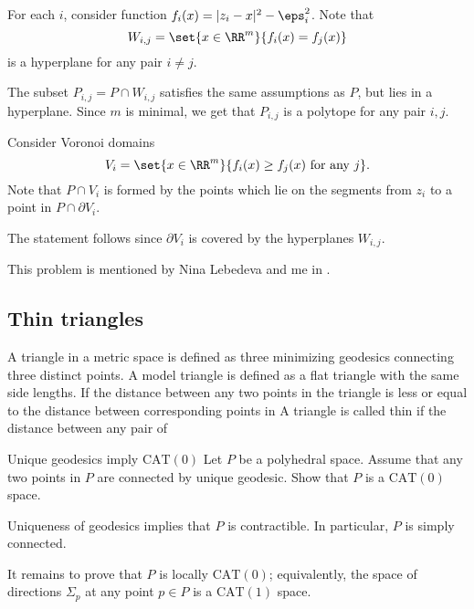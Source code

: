 For each $i$, consider function $f_i(x)=|z_i-x|^2-\eps_i^2$.
Note that
\[W_{i,j}=\set{x\in\RR^m}{f_i(x)=f_j(x)}\]
is a hyperplane for any pair $i\ne j$.

The subset $P_{i,j}=P\cap W_{i,j}$ satisfies the same assumptions as $P$, but lies in a hyperplane.
Since $m$ is minimal, we get that $P_{i,j}$ is a polytope for any pair $i,j$.

Consider Voronoi domains 
\[V_{i}=\set{x\in\RR^m}{f_i(x)\ge f_j(x) \ \text{for any}\ j}.\]
Note that $P\cap V_i$ is formed by the points which lie on the segments from $z_i$ to a point in  $P\cap \partial V_i$.

The statement follows since $\partial V_i$ is covered by the hyperplanes $W_{i,j}$.
\qeds

This problem is mentioned 
by Nina Lebedeva and me in \cite{lebedeva-petrunin}.














\subsection*{Thin triangles\easy}

A triangle in a metric space is defined as three minimizing  geodesics connecting three distinct points.
A model triangle is defined as a flat triangle with the same side lengths.
If the distance between any two points in the triangle is less or equal to the distance between corresponding points in 
A triangle is called thin if the distance between any pair of


\begin{pr}{\easy}{Unique geodesics imply $\mathrm{CAT}(0)$}\label{Unique geodesics imply CAT}
Let $P$ be a polyhedral space.
Assume that any two points in $P$ 
are connected by unique geodesic.
Show that $P$ is a $\mathrm{CAT}(0)$ space.
\end{pr}


Uniqueness of geodesics implies that $P$ is contractible.
In particular, $P$ is simply connected.

It remains to prove that $P$ is locally $\mathrm{CAT}(0)$;
equivalently, the space of directions $\Sigma_p$
at any point $p\in P$ is  a $\mathrm{CAT}(1)$ space.

